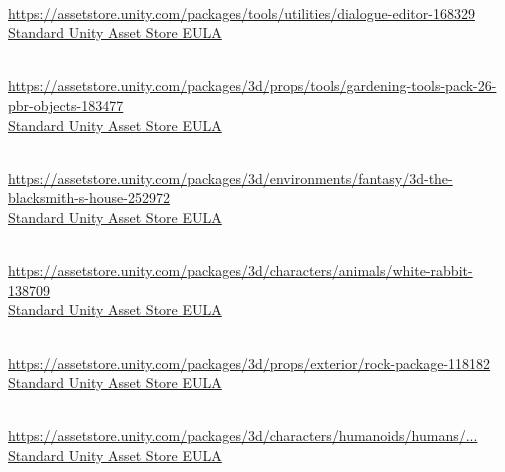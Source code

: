 \begin{description}[]
\item[Dialogue Editor] \hfill \\ \url{https://assetstore.unity.com/packages/tools/utilities/dialogue-editor-168329} \\
  \href{https://unity.com/legal/as-terms}{Standard Unity Asset Store EULA}

\item[Gardening Tools Pack - 26 PBR objects] \hfill \\ \url{https://assetstore.unity.com/packages/3d/props/tools/gardening-tools-pack-26-pbr-objects-183477} \\
  \href{https://unity.com/legal/as-terms}{Standard Unity Asset Store EULA}

\item[3D The Blacksmith's House] \hfill \\ \url{https://assetstore.unity.com/packages/3d/environments/fantasy/3d-the-blacksmith-s-house-252972} \\
  \href{https://unity.com/legal/as-terms}{Standard Unity Asset Store EULA}

\item[White Rabbit] \hfill \\ \url{https://assetstore.unity.com/packages/3d/characters/animals/white-rabbit-138709} \\
  \href{https://unity.com/legal/as-terms}{Standard Unity Asset Store EULA}

\item[Rock package] \hfill \\ \url{https://assetstore.unity.com/packages/3d/props/exterior/rock-package-118182} \\
  \href{https://unity.com/legal/as-terms}{Standard Unity Asset Store EULA}

\item[FREE - Modular Character - Fantasy RPG Human Male] \hfill \\ \href{https://assetstore.unity.com/packages/3d/characters/humanoids/humans/free-modular-character-fantasy-rpg-human-male-228952}{https://assetstore.unity.com/packages/3d/characters/humanoids/humans/...} \\
  \href{https://unity.com/legal/as-terms}{Standard Unity Asset Store EULA}
\end{description}
%
%
%
%
